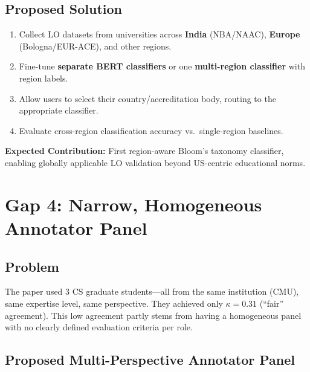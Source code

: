 \documentclass[11pt,a4paper]{article}
\begin{document}
\subsection{Proposed Solution}
\begin{enumerate}[nosep]
    \item Collect LO datasets from universities across \textbf{India} (NBA/NAAC), \textbf{Europe} (Bologna/EUR-ACE), and other regions.
    \item Fine-tune \textbf{separate BERT classifiers} or one \textbf{multi-region classifier} with region labels.
    \item Allow users to select their country/accreditation body, routing to the appropriate classifier.
    \item Evaluate cross-region classification accuracy vs.\ single-region baselines.
\end{enumerate}

\begin{notebox}
\textbf{Expected Contribution:} First region-aware Bloom's taxonomy classifier, enabling globally applicable LO validation beyond US-centric educational norms.
\end{notebox}

\section{Gap 4: Narrow, Homogeneous Annotator Panel}

\subsection{Problem}
The paper used 3 CS graduate students---all from the same institution (CMU), same expertise level, same perspective. They achieved only $\kappa = 0.31$ (``fair'' agreement). This low agreement partly stems from having a homogeneous panel with no clearly defined evaluation criteria per role.

\subsection{Proposed Multi-Perspective Annotator Panel}
\end{document}
